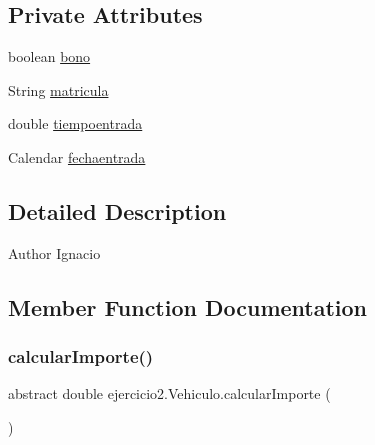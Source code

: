 \subsection*{Private Attributes}
\begin{DoxyCompactItemize}
\item 
boolean \mbox{\hyperlink{classejercicio2_1_1_vehiculo_a389cff48d0624a033052cc0bb27aff16}{bono}}
\item 
String \mbox{\hyperlink{classejercicio2_1_1_vehiculo_ad1079a268592164697f127dc2880c32b}{matricula}}
\item 
double \mbox{\hyperlink{classejercicio2_1_1_vehiculo_ae69e0b6da5d8596b7a4a16363a13242e}{tiempoentrada}}
\item 
Calendar \mbox{\hyperlink{classejercicio2_1_1_vehiculo_a6358d487f847acdf071ab9612ae92cf2}{fechaentrada}}
\end{DoxyCompactItemize}


\subsection{Detailed Description}
\begin{DoxyAuthor}{Author}
Ignacio 
\end{DoxyAuthor}


\subsection{Member Function Documentation}
\mbox{\label{classejercicio2_1_1_vehiculo_ab32f1a3fc1893a90bbbaf7889274fff1}} 
\subsubsection{\texorpdfstring{calcular\+Importe()}{calcularImporte()}}
{\footnotesize\ttfamily abstract double ejercicio2.\+Vehiculo.\+calcular\+Importe (\begin{DoxyParamCaption}{ }\end{DoxyParamCaption})\hspace{0.3cm}{\ttfamily [abstract]}}

\mbox{\label{classejercicio2_1_1_vehiculo_a2d1656bbaf85a6d0835df1fefc1b7989}} 
